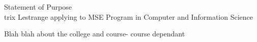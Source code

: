 \documentclass{article}
\begin{document}
\begin{center}
\LARGE{Statement of Purpose}\\[2ex]

\large{ trix Lestrange applying to MSE Program in Computer and Information Science }
\end{center}

\bigskip

Blah blah about the college and course- course dependant
\end{document}
